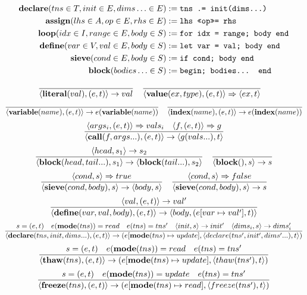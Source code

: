 \begin{align*}
    \text{\textbf{declare}}(tns \in T, init \in E, dims\ldots \in E) &:= \text{\texttt{tns .= init(dims...)}} \\
    \text{\textbf{assign}}(lhs \in A, op \in E, rhs \in E) &:= \text{\texttt{lhs \texttt{<<op>>=} rhs}} \\
    \text{\textbf{loop}}(idx \in I, range \in E, body \in S) &:= \text{\texttt{for idx = range; body end}} \\
    \text{\textbf{define}}(var \in V, val \in E, body \in S) &:= \text{\texttt{let var = val; body end}} \\
    \text{\textbf{sieve}}(cond \in E, body \in S) &:= \text{\texttt{if cond; body end}} \\
    \text{\textbf{block}}(bodies\ldots \in S) &:= \text{\texttt{begin; bodies... end}}
\end{align*}

\[
    \frac{}{\langle\text{\textbf{literal}}(val), (e, t)\rangle \rightarrow val} \quad
    \frac{}{\langle\text{\textbf{value}}(ex, type), (e, t)\rangle \Rightarrow \langle ex, t \rangle} \quad
\]
\[
    \frac{}{\langle\text{\textbf{variable}}(name), (e, t)\rangle \rightarrow e(\text{\textbf{variable}}(name))} \quad
    \frac{}{\langle\text{\textbf{index}}(name), (e, t)\rangle \rightarrow e(\text{\textbf{index}}(name))}
\]
\[
    \frac{\langle args_i, (e, t) \rangle \Rightarrow vals_i \quad \langle f, (e, t) \rangle \Rightarrow g}
    {\langle\text{\textbf{call}}(f, args...), (e, t)\rangle \rightarrow \langle g(vals...), t \rangle}
\]
\[
\frac{\langle head, s_1 \rangle \rightarrow s_2}
{\langle\text{\textbf{block}}(head, tail...), s_1 \rangle \rightarrow \langle \text{\textbf{block}}(tail...), s_2 \rangle} \quad
\frac{}{\langle\text{\textbf{block}}(), s\rangle \rightarrow s}
\]
\[
\frac{\langle cond, s \rangle \Rightarrow true}
{\langle\text{\textbf{sieve}}(cond, body), s\rangle \rightarrow \langle body, s \rangle}\quad
\frac{\langle cond, s \rangle \Rightarrow false}
{\langle\text{\textbf{sieve}}(cond, body), s\rangle \rightarrow s}
\]
\[
\frac{\langle val, (e, t) \rangle \rightarrow val'}
{\langle\text{\textbf{define}}(var, val, body), (e, t)\rangle \rightarrow \langle body, (e[var \mapsto val'], t) \rangle}
\]
\[
\frac{s = (e, t) \quad e(\text{\textbf{mode}}(tns)) = read \quad e(tns) = tns' \quad  \langle init, s \rangle \rightarrow init' \quad  \langle dims_i, s \rangle \rightarrow dims_i'}
{\langle\text{\textbf{declare}}(tns, init, dims...), (e, t)\rangle \rightarrow (e [\text{\textbf{mode}}(tns) \mapsto update], \langle declare(tns', init', dims'...), t \rangle)}
\]
\[
\frac{s = (e, t) \quad e(\text{\textbf{mode}}(tns)) = read \quad e(tns) = tns'}
{\langle\text{\textbf{thaw}}(tns), (e, t)\rangle \rightarrow (e [\text{\textbf{mode}}(tns) \mapsto update], \langle thaw(tns'), t \rangle)}
\]
\[
\frac{s = (e, t) \quad e(\text{\textbf{mode}}(tns)) = update \quad e(tns) = tns'}
{\langle\text{\textbf{freeze}}(tns), (e, t)\rangle \rightarrow (e [\text{\textbf{mode}}(tns) \mapsto read], \langle freeze(tns'), t \rangle)}
\]

